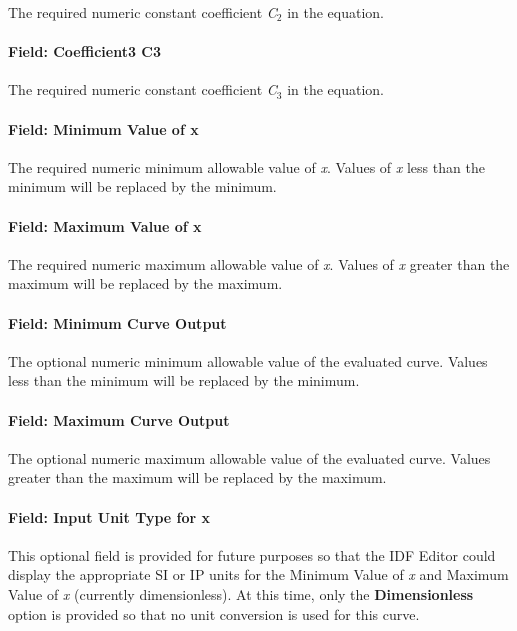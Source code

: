 The required numeric constant coefficient \emph{C\(_{2}\)} in the equation.

\paragraph{Field: Coefficient3 C3}\label{field-coefficient3-c3-4}

The required numeric constant coefficient \emph{C\(_{3}\)} in the equation.

\paragraph{Field: Minimum Value of x}\label{field-minimum-value-of-x-16}

The required numeric minimum allowable value of \emph{x}. Values of \emph{x} less than the minimum will be replaced by the minimum.

\paragraph{Field: Maximum Value of x}\label{field-maximum-value-of-x-17}

The required numeric maximum allowable value of \emph{x}. Values of \emph{x} greater than the maximum will be replaced by the maximum.

\paragraph{Field: Minimum Curve Output}\label{field-minimum-curve-output-16}

The optional numeric minimum allowable value of the evaluated curve. Values less than the minimum will be replaced by the minimum.

\paragraph{Field: Maximum Curve Output}\label{field-maximum-curve-output-15}

The optional numeric maximum allowable value of the evaluated curve. Values greater than the maximum will be replaced by the maximum.

\paragraph{Field: Input Unit Type for x}\label{field-input-unit-type-for-x-16}

This optional field is provided for future purposes so that the IDF Editor could display the appropriate SI or IP units for the Minimum Value of \emph{x} and Maximum Value of \emph{x} (currently dimensionless). At this time, only the \textbf{Dimensionless} option is provided so that no unit conversion is used for this curve.

